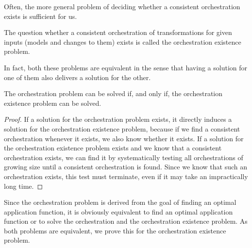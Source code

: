 Often, the more general problem of deciding whether a consistent orchestration exists is sufficient for us.
\begin{definition}
    \label{def:orchestrationexistenceproblem}
    The question whether a consistent orchestration of transformations for given inputs (models and changes to them) exists is called the orchestration existence problem.
\end{definition}

In fact, both these problems are equivalent in the sense that having a solution for one of them also delivers a solution for the other.
\begin{theorem}
    The orchestration problem can be solved if, and only if, the orchestration existence problem can be solved.
\end{theorem}
\begin{proof}
    If a solution for the orchestration problem exists, it directly induces a solution for the orchestration existence problem, because if we find a consistent orchestration whenever it exists, we also know whether it exists.
    If a solution for the orchestration existence problem exists and we know that a consistent orchestration exists, we can find it by systematically testing all orchestrations of growing size until a consistent orchestration is found. Since we know that such an orchestration exists, this test must terminate, even if it may take an impractically long time.
\end{proof}

Since the orchestration problem is derived from the goal of finding an optimal application function, it is obviously equivalent to find an optimal application function or to solve the orchestration and the orchestration existence problem.
As both problems are equivalent, we prove this for the orchestration existence problem.

